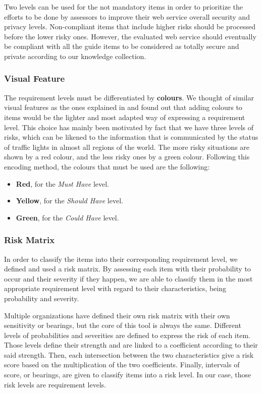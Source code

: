 Two levels can be used for the not mandatory items in order to prioritize the efforts to be done by assessors to improve their web service overall security and privacy levels. Non-compliant items that include higher risks should be processed before the lower risky ones. However, the evaluated web service should eventually be compliant with all the guide items to be considered as totally secure and private according to our knowledge collection.

\subsubsection{Visual Feature}
\label{subsec:proposal_content_levels_visual}

The requirement levels must be differentiated by \textbf{colours}. We thought of similar visual features as the ones explained in  and found out that adding colours to items would be the lighter and most adapted way of expressing a requirement level. This choice has mainly been motivated by fact that we have three levels of risks, which can be likened to the information that is communicated by the status of traffic lights in almost all regions of the world. The more risky situations are shown by a red colour, and the less risky ones by a green colour. Following this encoding method, the colours that must be used are the following:
\begin{itemize}
    \item \textbf{Red}, for the \textit{Must Have} level.
    \item \textbf{Yellow}, for the \textit{Should Have} level.
    \item \textbf{Green}, for the \textit{Could Have} level.
\end{itemize}

\subsubsection{Risk Matrix}
\label{subsec:proposal_content_levels_risks}

In order to classify the items into their corresponding requirement level, we defined and used a risk matrix. By assessing each item with their probability to occur and their severity if they happen, we are able to classify them in the most appropriate requirement level with regard to their characteristics, being probability and severity.

Multiple organizations have defined their own risk matrix with their own sensitivity or bearings, but the core of this tool is always the same. Different levels of probabilities and severities are defined to express the risk of each item. Those levels define their strength and are linked to a coefficient according to their said strength. Then, each intersection between the two characteristics give a risk score based on the multiplication of the two coefficients. Finally, intervals of score, or bearings, are given to classify items into a risk level. In our case, those risk levels are requirement levels.


